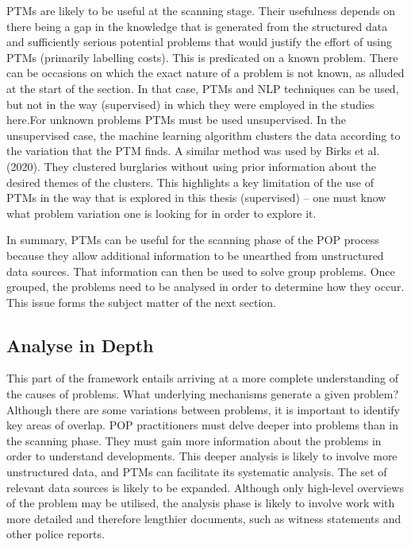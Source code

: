 PTMs are likely to be useful at the scanning stage. Their usefulness depends on there being a gap in the knowledge that is generated from the structured data and sufficiently serious potential problems that would justify the effort of using PTMs (primarily labelling costs). This is predicated on a known problem. There can be occasions on which the exact nature of a problem is not known, as alluded at the start of the section. In that case, PTMs and NLP techniques can be used, but not in the way (supervised) in which they were employed in the studies here.For unknown problems PTMs must be used unsupervised. In the unsupervised case, the machine learning algorithm clusters the data according to the variation that the PTM finds. A similar method was used by Birks et al. (2020). They clustered burglaries without using prior information about the desired themes of the clusters. This highlights a key limitation of the use of PTMs in the way that is explored in this thesis (supervised) – one must know what problem variation one is looking for in order to explore it.

In summary, PTMs can be useful for the scanning phase of the POP process because they allow additional information to be unearthed from unstructured data sources. That information can then be used to solve group problems. Once grouped, the problems need to be analysed in order to determine how they occur. This issue forms the subject matter of the next section.


\subsection{Analyse in Depth} This part of the framework entails arriving at a more complete understanding of the causes of problems. What underlying mechanisms generate a given problem? Although there are some variations between problems, it is important to identify key areas of overlap. POP practitioners must delve deeper into problems than in the scanning phase. They must gain more information about the problems in order to understand developments. This deeper analysis is likely to involve more unstructured data, and PTMs can facilitate its systematic analysis. The set of relevant data sources is likely to be expanded. Although only high-level overviews of the problem may be utilised, the analysis phase is likely to involve work with more detailed and therefore lengthier documents, such as witness statements and other police reports.

